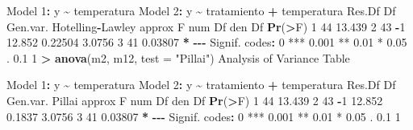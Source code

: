 \documentclass[
  a4paper,
  oneside]{scrbook}
\newenvironment{Shaded}{\begin{snugshade}}{\end{snugshade}}
\newcommand{\AttributeTok}[1]{\textcolor[rgb]{0.13,0.29,0.53}{#1}}
\newcommand{\DecValTok}[1]{\textcolor[rgb]{0.00,0.00,0.81}{#1}}
\newcommand{\FloatTok}[1]{\textcolor[rgb]{0.00,0.00,0.81}{#1}}
\newcommand{\FunctionTok}[1]{\textcolor[rgb]{0.13,0.29,0.53}{\textbf{#1}}}
\newcommand{\NormalTok}[1]{#1}
\newcommand{\SpecialCharTok}[1]{\textcolor[rgb]{0.81,0.36,0.00}{\textbf{#1}}}
\newcommand{\StringTok}[1]{\textcolor[rgb]{0.31,0.60,0.02}{#1}}
\theoremstyle{definition}
\theoremstyle{definition}
\theoremstyle{definition}
\theoremstyle{definition}
\theoremstyle{remark}
\begin{document}
\begin{Shaded}
\begin{Highlighting}[]
\NormalTok{Model }\DecValTok{1}\SpecialCharTok{:}\NormalTok{ y }\SpecialCharTok{\textasciitilde{}}\NormalTok{ temperatura}
\NormalTok{Model }\DecValTok{2}\SpecialCharTok{:}\NormalTok{ y }\SpecialCharTok{\textasciitilde{}}\NormalTok{ tratamiento }\SpecialCharTok{+}\NormalTok{ temperatura}
\NormalTok{  Res.Df Df Gen.var. Hotelling}\SpecialCharTok{{-}}\NormalTok{Lawley approx F num Df den Df  }\FunctionTok{Pr}\NormalTok{(}\SpecialCharTok{\textgreater{}}\NormalTok{F)  }
\DecValTok{1}     \DecValTok{44}      \FloatTok{13.439}                                                  
\DecValTok{2}     \DecValTok{43} \SpecialCharTok{{-}}\DecValTok{1}   \FloatTok{12.852}          \FloatTok{0.22504}   \FloatTok{3.0756}      \DecValTok{3}     \DecValTok{41} \FloatTok{0.03807} \SpecialCharTok{*}
\SpecialCharTok{{-}{-}{-}}
\NormalTok{Signif. codes}\SpecialCharTok{:}  \DecValTok{0} \StringTok{\textquotesingle{}***\textquotesingle{}} \FloatTok{0.001} \StringTok{\textquotesingle{}**\textquotesingle{}} \FloatTok{0.01} \StringTok{\textquotesingle{}*\textquotesingle{}} \FloatTok{0.05} \StringTok{\textquotesingle{}.\textquotesingle{}} \FloatTok{0.1} \StringTok{\textquotesingle{} \textquotesingle{}} \DecValTok{1}
\SpecialCharTok{\textgreater{}} \FunctionTok{anova}\NormalTok{(m2, m12, }\AttributeTok{test =} \StringTok{"Pillai"}\NormalTok{)}
\NormalTok{Analysis of Variance Table}

\NormalTok{Model }\DecValTok{1}\SpecialCharTok{:}\NormalTok{ y }\SpecialCharTok{\textasciitilde{}}\NormalTok{ temperatura}
\NormalTok{Model }\DecValTok{2}\SpecialCharTok{:}\NormalTok{ y }\SpecialCharTok{\textasciitilde{}}\NormalTok{ tratamiento }\SpecialCharTok{+}\NormalTok{ temperatura}
\NormalTok{  Res.Df Df Gen.var. Pillai approx F num Df den Df  }\FunctionTok{Pr}\NormalTok{(}\SpecialCharTok{\textgreater{}}\NormalTok{F)  }
\DecValTok{1}     \DecValTok{44}      \FloatTok{13.439}                                        
\DecValTok{2}     \DecValTok{43} \SpecialCharTok{{-}}\DecValTok{1}   \FloatTok{12.852} \FloatTok{0.1837}   \FloatTok{3.0756}      \DecValTok{3}     \DecValTok{41} \FloatTok{0.03807} \SpecialCharTok{*}
\SpecialCharTok{{-}{-}{-}}
\NormalTok{Signif. codes}\SpecialCharTok{:}  \DecValTok{0} \StringTok{\textquotesingle{}***\textquotesingle{}} \FloatTok{0.001} \StringTok{\textquotesingle{}**\textquotesingle{}} \FloatTok{0.01} \StringTok{\textquotesingle{}*\textquotesingle{}} \FloatTok{0.05} \StringTok{\textquotesingle{}.\textquotesingle{}} \FloatTok{0.1} \StringTok{\textquotesingle{} \textquotesingle{}} \DecValTok{1}
\end{Highlighting}
\end{Shaded}
\end{document}
